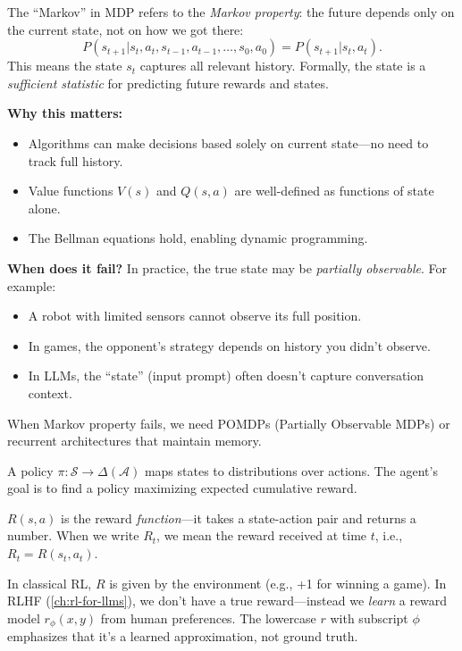 \begin{remark}
    The ``Markov'' in MDP refers to the \emph{Markov property}: the future depends only on the current state, not on how we got there:
    \[
        P(s_{t+1} | s_t, a_t, s_{t-1}, a_{t-1}, \ldots, s_0, a_0) = P(s_{t+1} | s_t, a_t).
    \]
    This means the state $s_t$ captures all relevant history. Formally, the state is a \emph{sufficient statistic} for predicting future rewards and states.

    \textbf{Why this matters:}
    \begin{itemize}
        \item Algorithms can make decisions based solely on current state---no need to track full history.
        \item Value functions $V(s)$ and $Q(s,a)$ are well-defined as functions of state alone.
        \item The Bellman equations hold, enabling dynamic programming.
    \end{itemize}

    \textbf{When does it fail?}
    In practice, the true state may be \emph{partially observable}. For example:
    \begin{itemize}
        \item A robot with limited sensors cannot observe its full position.
        \item In games, the opponent's strategy depends on history you didn't observe.
        \item In LLMs, the ``state'' (input prompt) often doesn't capture conversation context.
    \end{itemize}
    When Markov property fails, we need POMDPs (Partially Observable MDPs) or recurrent architectures that maintain memory.
\end{remark}

\begin{definition}[Policy]
    A policy $\pi: \mathcal{S} \to \Delta(\mathcal{A})$ maps states to distributions over actions. The agent's goal is to find a policy maximizing expected cumulative reward.
\end{definition}

\begin{remark}
    $R(s,a)$ is the reward \emph{function}---it takes a state-action pair and returns a number. When we write $R_t$, we mean the reward received at time $t$, i.e., $R_t = R(s_t, a_t)$.

    In classical RL, $R$ is given by the environment (e.g., +1 for winning a game). In RLHF (\cref{ch:rl-for-llms}), we don't have a true reward---instead we \emph{learn} a reward model $r_\phi(x,y)$ from human preferences. The lowercase $r$ with subscript $\phi$ emphasizes that it's a learned approximation, not ground truth.
\end{remark}

